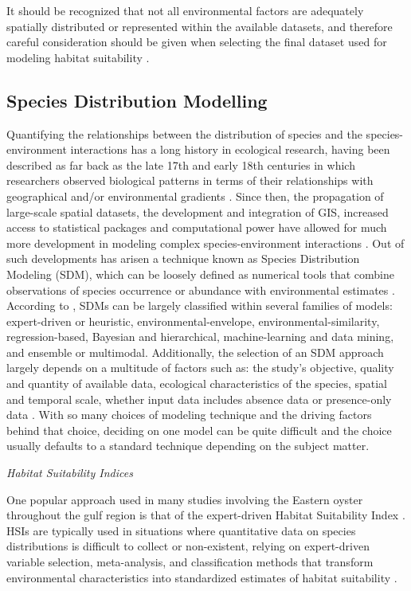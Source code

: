 \documentclass[
  review]{elsarticle}
\begin{document}
It should be recognized that not all environmental factors are
adequately spatially distributed or represented within the available
datasets, and therefore careful consideration should be given when
selecting the final dataset used for modeling habitat suitability
\citep{LaPeyre2021, Geselbracht2024, Christensen1997}.

\subsection{Species Distribution
Modelling}\label{species-distribution-modelling}

Quantifying the relationships between the distribution of species and
the species-environment interactions has a long history in ecological
research, having been described as far back as the late 17th and early
18th centuries in which researchers observed biological patterns in
terms of their relationships with geographical and/or environmental
gradients \citep{Rushton2004, Elith2009}. Since then, the propagation of
large-scale spatial datasets, the development and integration of GIS,
increased access to statistical packages and computational power have
allowed for much more development in modeling complex
species-environment interactions \citep{Johnson2005}. Out of such
developments has arisen a technique known as Species Distribution
Modeling (SDM), which can be loosely defined as numerical tools that
combine observations of species occurrence or abundance with
environmental estimates \citep{Elith2009}. According to
\citet{Elith2009}, SDMs can be largely classified within several
families of models: expert-driven or heuristic, environmental-envelope,
environmental-similarity, regression-based, Bayesian and hierarchical,
machine-learning and data mining, and ensemble or multimodal.
Additionally, the selection of an SDM approach largely depends on a
multitude of factors such as: the study's objective, quality and
quantity of available data, ecological characteristics of the species,
spatial and temporal scale, whether input data includes absence data or
presence-only data \citep{Elith2009}. With so many choices of modeling
technique and the driving factors behind that choice, deciding on one
model can be quite difficult and the choice usually defaults to a
standard technique depending on the subject matter.

\emph{Habitat Suitability Indices}

One popular approach used in many studies involving the Eastern oyster
throughout the gulf region is that of the expert-driven Habitat
Suitability Index
\citep{Barnes2007, Pollack2012, Geselbracht2024, Christensen1997}. HSIs
are typically used in situations where quantitative data on species
distributions is difficult to collect or non-existent, relying on
expert-driven variable selection, meta-analysis, and classification
methods that transform environmental characteristics into standardized
estimates of habitat suitability
\citep{Barnes2007, Pollack2012, Geselbracht2024, Johnson2005}.
\end{document}
